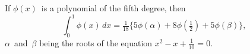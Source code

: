 If $\phi(x)$~is a polynomial of the fifth degree, then
\[
\int_{0}^{1} \phi(x)\, dx
  = \tfrac{1}{18}\{5\phi(\alpha) + 8\phi(\tfrac{1}{2}) + 5\phi(\beta)\},
\]
$\alpha$~and~$\beta$ being the roots of the equation $x^{2} - x + \frac{1}{10} = 0$. 

